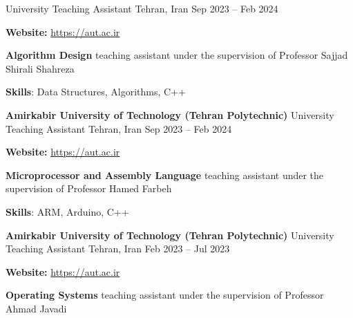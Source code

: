 \documentclass[]{awesome-cv}
\begin{document}
\begin{cventries}
	{University Teaching Assistant}
	{Tehran, Iran}
	{Sep 2023 – Feb 2024}
	{\begin{cvitems}
        \vspace{1mm}
        \item[] {\hspace{-9mm}\textbf{Website:} \href{https://aut.ac.ir}{\textcolor{awesome}{https://aut.ac.ir}}}
		\vspace{1mm}
		\item[] {\hspace{-9mm}}\textbf{Algorithm Design} teaching assistant under the supervision of Professor Sajjad Shirali Shahreza
		\vspace{1mm}
        \item {\textbf{Skills}: Data Structures, Algorithms, C++}
        \vspace{1mm}
	\end{cvitems}}
	\cventry
	{\textbf{Amirkabir University of Technology (Tehran Polytechnic)}}
	{University Teaching Assistant}
	{Tehran, Iran}
	{Sep 2023 – Feb 2024}
	{\begin{cvitems}
        \vspace{1mm}
        \item[] {\hspace{-9mm}\textbf{Website:} \href{https://aut.ac.ir}{\textcolor{awesome}{https://aut.ac.ir}}}
		\vspace{1mm}
		\item[] {\hspace{-9mm}}\textbf{Microprocessor and Assembly Language} teaching assistant under the supervision of Professor Hamed Farbeh
		\vspace{1mm}
        \item {\textbf{Skills}: ARM, Arduino, C++}
        \vspace{1mm}
	\end{cvitems}}
	\cventry
	{\textbf{Amirkabir University of Technology (Tehran Polytechnic)}}
	{University Teaching Assistant}
	{Tehran, Iran}
	{Feb 2023 – Jul 2023}
	{\begin{cvitems}
        \vspace{1mm}
        \item[] {\hspace{-9mm}\textbf{Website:} \href{https://aut.ac.ir}{\textcolor{awesome}{https://aut.ac.ir}}}
		\vspace{1mm}
		\item[] {\hspace{-9mm}}\textbf{Operating Systems} teaching assistant under the supervision of Professor Ahmad Javadi

\end{cvitems}}
\end{cventries}
\end{document}
